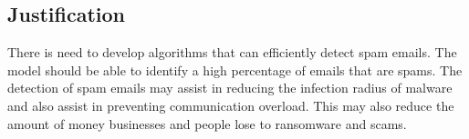 \subsection{Justification}
There is need to develop algorithms that can efficiently detect spam emails. The model should be able to identify a high percentage of emails that are spams. The detection of spam emails may assist in reducing the infection radius of malware and also assist in preventing communication overload. This may also reduce the amount of money businesses and people lose to ransomware and scams.